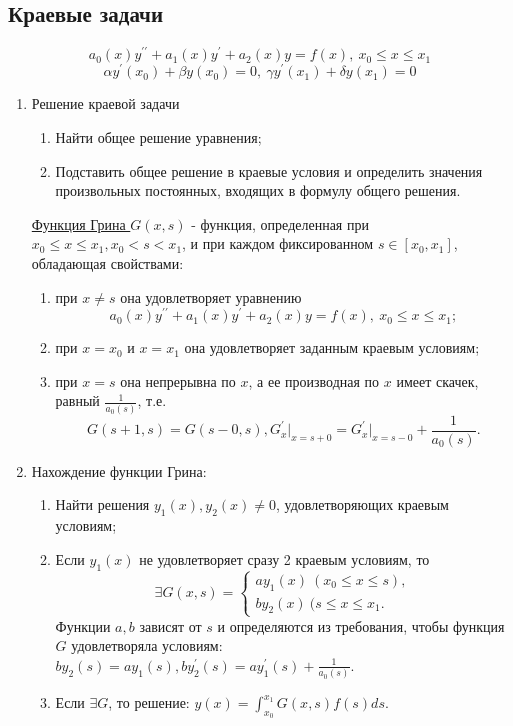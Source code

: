 \documentclass[a5paper,10pt]{article}
\begin{document}
		\subsection{Краевые задачи}
			$$ a_0(x)y^{\prime\prime} + a_1(x)y^{\prime} + a_2(x)y = f(x), \ x_0 \leq x \leq x_1 $$
			$$ \alpha y^{\prime}(x_0) + \beta y(x_0) = 0, \ \gamma y^{\prime}(x_1) + \delta y(x_1) = 0 $$
			\begin{enumerate}
				\item Решение краевой задачи
					\begin{enumerate}
						\item Найти общее решение уравнения;
						\item Подставить общее решение в краевые условия и определить значения произвольных постоянных, входящих в формулу общего решения.
					\end{enumerate}

				\begin{framed}
					\underline{Функция Грина $ G(x,s) $} - функция, определенная при $ x_0 \leq x \leq x_1, x_0 < s < x_1 $, и при каждом фиксированном $ s \in [x_0,x_1] $, обладающая свойствами:
					\begin{enumerate}
						\item при $ x \neq s $ она удовлетворяет уравнению
						$$ a_0(x)y^{\prime\prime} + a_1(x)y^{\prime} + a_2(x)y = f(x), \ x_0 \leq x \leq x_1; $$

						\item при $ x = x_0 $ и $ x = x_1 $ она удовлетворяет заданным краевым условиям;

						\item при $ x = s $ она непрерывна по $x$, а ее производная по $x$ имеет скачек, равный $ \frac{1}{a_0(s)} $, т.е.
						$$ G(s+1,s) = G(s-0,s), G_x^{\prime}\bigg|_{x=s+0} = G_x^{\prime}\bigg|_{x=s-0}+\frac{1}{a_0(s)}. $$
					\end{enumerate}
				\end{framed}

				\item Нахождение функции Грина:
					\begin{enumerate}
						\item Найти решения $ y_1(x), y_2(x) \neq 0 $, удовлетворяющих краевым условиям;
						\item Если $ y_1(x) $ не удовлетворяет сразу 2 краевым условиям, то
						\begin{equation*}
							\exists G(x,s) = 
							\begin{cases}
								ay_1(x) \ (x_0 \leq x \leq s),\\
								by_2(x) \ (s \leq x \leq x_1.
							\end{cases}
						\end{equation*}
						Функции $a,b$ зависят от $s$ и определяются из требования, чтобы функция $G$ удовлетворяла условиям: $ by_2(s) = ay_1(s), by_2^{\prime}(s) = ay_1^{\prime}(s) + \frac{1}{a_0(s)} $.
						\item Если $ \exists G $, то решение: $ y(x) = \int_{x_0}^{x_1} G(x,s)f(s)ds $.
					\end{enumerate}
			\end{enumerate}
\end{document}
